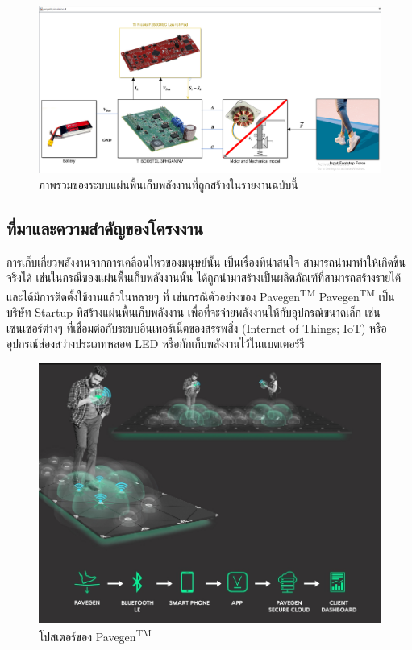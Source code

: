 \documentclass[11pt,a4paper]{article}
\begin{document}
\begin{figure}
    \centering
    \includegraphics[width=\textwidth]{layer0.png}
    \caption{ภาพรวมของระบบแผ่นพื้นเก็บพลังงานที่ถูกสร้างในรายงานฉบับนี้}
\end{figure}

\subsection{ที่มาและความสำคัญของโครงงาน}
การเก็บเกี่ยวพลังงานจากการเคลื่อนไหวของมนุษย์นั้น เป็นเรื่องที่น่าสนใจ สามารถนำมาทำให้เกิดขึ้นจริงได้ เช่นในกรณีของแผ่นพื้นเก็บพลังงานนั้น ได้ถูกนำมาสร้างเป็นผลิตภัณฑ์ที่สามารถสร้างรายได้ และได้มีการติดตั้งใช้งานแล้วในหลายๆ ที่ เช่นกรณีตัวอย่างของ Pavegen\textsuperscript{TM} Pavegen\textsuperscript{TM} เป็นบริษัท Startup ที่สร้างแผ่นพื้นเก็บพลังงาน เพื่อที่จะจ่ายพลังงานให้กับอุปกรณ์ขนาดเล็ก เช่น เซนเซอร์ต่างๆ ที่เชื่อมต่อกับระบบอินเทอร์เน็ตของสรรพสิ่ง (Internet of Things; IoT) หรืออุปกรณ์ส่องสว่างประเภทหลอด LED หรือกักเก็บพลังงานไว้ในแบตเตอร์รี

\begin{figure}
    \centering
    \includegraphics[width=\textwidth]{pavegen_poster.jpg}
    \caption{โปสเตอร์ของ Pavegen\textsuperscript{TM}}
\end{figure}
\end{document}
